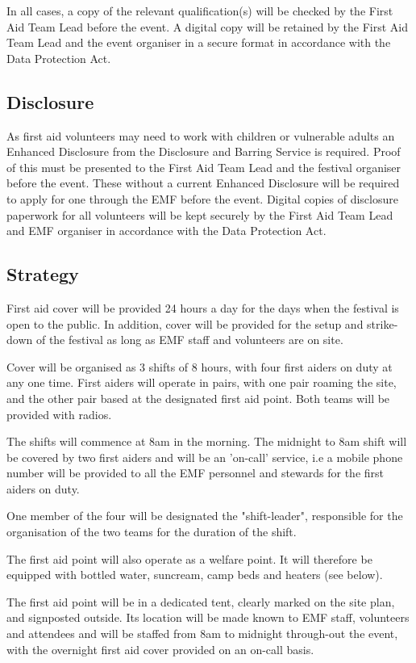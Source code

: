In all cases, a copy of the relevant qualification(s) will be checked by the
First Aid Team Lead before the event. A digital copy will be retained by the
First Aid Team Lead and the event organiser in a secure format in accordance
with the Data Protection Act.

\subsection{Disclosure}
As first aid volunteers may need to work with children or vulnerable adults an
Enhanced Disclosure from the Disclosure and Barring Service is required. Proof
of this must be presented to the First Aid Team Lead and the festival organiser
before the event. These without a current Enhanced Disclosure will be required
to apply for one through the EMF  before the event. Digital copies of disclosure
paperwork for all volunteers will be kept securely by the First Aid Team Lead and
EMF organiser in accordance with the Data Protection Act.

\subsection{Strategy}
First aid cover will be provided 24 hours a day for the days when the festival
is open to the public. In addition, cover will be provided for the setup and
strike-down of the festival as long as EMF staff and volunteers are on site.

Cover will be organised as 3 shifts of 8 hours, with four first aiders on duty
at any one time. First aiders will operate in pairs, with one pair roaming the
site, and the other pair based at the designated first aid point. Both teams
will be provided with radios.

The shifts will commence at 8am in the morning. The midnight to 8am shift will
be covered by two first aiders and will be an 'on-call’ service, i.e a mobile
phone number will be provided to all the EMF personnel and stewards for the
first aiders on duty.

One member of the four will be designated the "shift-leader", responsible for the organisation of the two teams for the duration of the shift.

The first aid point will also operate as a welfare point. It will therefore be equipped with bottled water, suncream, camp beds and heaters (see below).

The first aid point will be in a dedicated tent, clearly marked on the site plan, and signposted outside. Its location will be made known to EMF staff, volunteers and attendees and will be staffed from 8am to midnight through-out the event, with the overnight first aid cover provided on an on-call basis.


